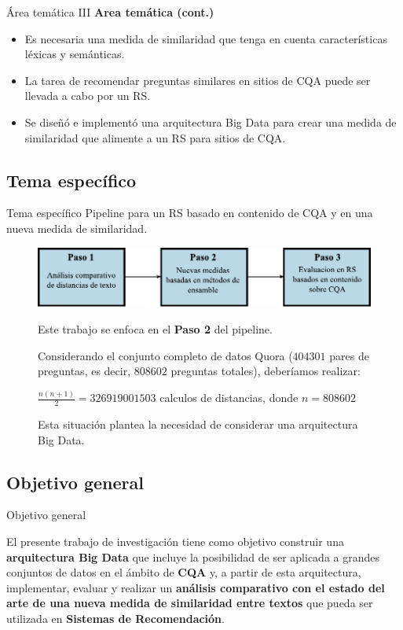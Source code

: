 \begin{frame}{Área temática III}
	\textbf{Area temática (cont.)}
	\medskip
	\begin{itemize}
		\item Es necesaria una medida de similaridad que tenga en cuenta características léxicas y semánticas.
		\item La tarea de recomendar preguntas similares en sitios de CQA puede ser llevada a cabo por un RS.
		\item Se diseñó e implementó una arquitectura Big Data para crear una medida de similaridad que alimente a un RS para sitios de CQA.
	\end{itemize}
\end{frame}

\subsection{Tema específico}
\begin{frame}[allowframebreaks]{Tema específico}
	Pipeline para un RS basado en contenido de CQA y en una nueva medida de similaridad.
	\medskip
	\begin{figure}
		\centering
		\includegraphics[width=0.7\linewidth]{../5_introduccion/imagenes/pipeline}
		\label{fig:pipeline}

		\bigskip

		Este trabajo se enfoca en el \textbf{Paso 2} del pipeline.

		\framebreak

		Considerando el conjunto completo de datos Quora (\(404301\) pares de preguntas, es decir, \(808602\) preguntas totales), deberíamos realizar:

		\bigskip $\frac{n(n+1)}{2} = 326919001503$ calculos de distancias, donde $n = 808602$

		\bigskip
		\bigskip

		Esta situación plantea la necesidad de considerar una arquitectura Big Data.
	\end{figure}
\end{frame}

\subsection{Objetivo general}
\begin{frame}{Objetivo general}
	\begin{tcolorbox}[colback=blue!5,colframe=blue!40!black,title=Objetivo general]
	El presente trabajo de investigación tiene como objetivo construir una \textbf{arquitectura Big Data} que incluye la posibilidad de ser aplicada a grandes conjuntos de datos en el ámbito de \textbf{CQA} y, a partir de esta arquitectura, implementar, evaluar y realizar un \textbf{análisis comparativo con el estado del arte de una nueva medida de similaridad entre textos} que pueda ser utilizada en \textbf{Sistemas de Recomendación}.
	\end{tcolorbox}
\end{frame}

